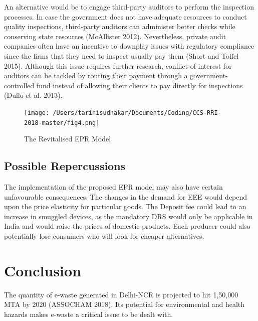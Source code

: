 \documentclass[a4paper, 12pt]{article}
\begin{document}
                    An alternative would be to engage third-party auditors to perform the inspection processes. In case the government does not have adequate resources to conduct quality inspections, third-party auditors can administer better checks while conserving state resources (McAllister 2012). Nevertheless, private audit companies often have an incentive to downplay issues with regulatory compliance since the firms that they need to inspect usually pay them (Short and Toffel 2015). Although this issue requires further research, conflict of interest for auditors can be tackled by routing their payment through a government-controlled fund instead of allowing their clients to pay directly for inspections (Duflo et al. 2013).\\

                     
                    \begin{figure}[H]
                    	\centering
                    	\texttt{[image: /Users/tarinisudhakar/Documents/Coding/CCS-RRI-2018-master/fig4.png]}
                    	\caption[Optional Caption]{The Revitalised EPR Model}
                    \end{figure}
                    
                    \subsection{Possible Repercussions}
                    
                    The implementation of the proposed EPR model may also have certain unfavourable consequences. The changes in the demand for EEE would depend upon the price elasticity for particular goods. The Deposit fee could lead to an increase in smuggled devices, as the mandatory DRS would only be applicable in India and would raise the prices of domestic products. Each producer could also potentially lose consumers who will look for cheaper alternatives. \\
                    
                    
                    \section{Conclusion}
                    
                    The quantity of e-waste generated in Delhi-NCR is projected to hit 1,50,000 MTA by 2020 (ASSOCHAM 2018). Its potential for environmental and health hazards makes e-waste a critical issue to be dealt with.\\
                     
\end{document}
